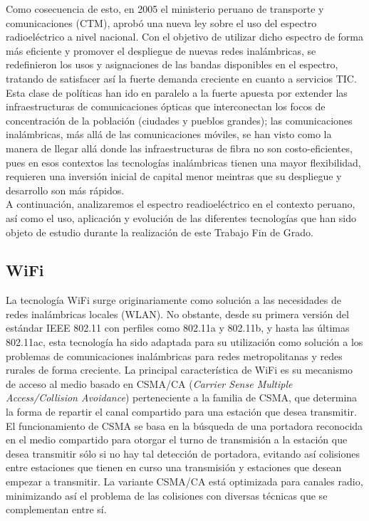 Como cosecuencia de esto, en 2005 el ministerio peruano de transporte y comunicaciones (CTM), aprobó una nueva ley sobre el uso del espectro radioeléctrico a nivel nacional. Con el objetivo de utilizar dicho espectro de forma más eficiente y promover el despliegue de nuevas redes inalámbricas, se redefinieron los usos y asignaciones de las bandas disponibles en el espectro, tratando de satisfacer así la fuerte demanda creciente en cuanto a servicios TIC. Esta clase de políticas han ido en paralelo a la fuerte apuesta por extender las infraestructuras de comunicaciones ópticas que interconectan los focos de concentración de la población (ciudades y pueblos grandes); las comunicaciones inalámbricas, más allá de las comunicaciones móviles, se han visto como la manera de llegar allá donde las infraestructuras de fibra no son costo-eficientes, pues en esos contextos las tecnologías inalámbricas tienen una mayor flexibilidad, requieren una inversión inicial de capital menor meintras que su despliegue y desarrollo son más rápidos.\\

A continuación, analizaremos el espectro readioeléctrico en el contexto peruano, así como el uso, aplicación y evolución de las diferentes tecnologías que han sido objeto de estudio durante la realización de este Trabajo Fin de Grado.

\subsection{WiFi}
La tecnología WiFi surge originariamente como solución a las necesidades de redes inalámbricas locales (WLAN). No obstante, desde su primera versión del estándar IEEE 802.11 con perfiles como 802.11a y 802.11b, y hasta las últimas 802.11ac, esta tecnología ha sido adaptada para su utilización como solución a los problemas de comunicaciones inalámbricas para redes metropolitanas y redes rurales de forma creciente. La principal característica de WiFi es su mecanismo de acceso al medio basado en CSMA/CA (\textit{Carrier Sense Multiple Access/Collision Avoidance}) perteneciente a la familia de CSMA, que determina la forma de repartir el canal compartido para una estación que desea transmitir. El funcionamiento de CSMA se basa en la búsqueda de una portadora reconocida en el medio compartido para otorgar el turno de transmisión a la estación que desea transmitir sólo si no hay tal detección de portadora, evitando así colisiones entre estaciones que tienen en curso una transmisión y estaciones que desean empezar a transmitir. La variante CSMA/CA está optimizada para canales radio, minimizando así el problema de las colisiones con diversas técnicas que se complementan entre sí.\\

